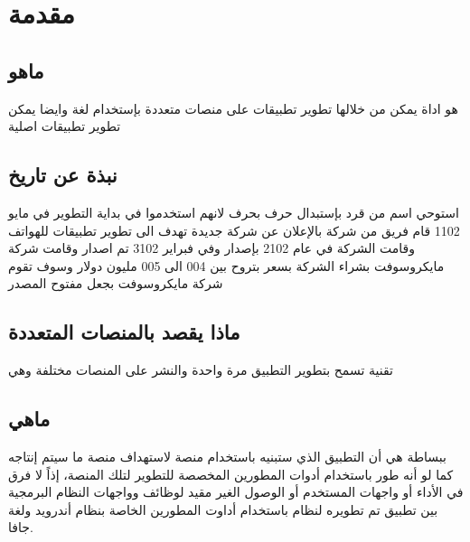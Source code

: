 \chapter{مقدمة}

\section {ماهو  }
هو اداة يمكن من خلالها تطوير تطبيقات على منصات متعددة  بإستخدام لغة  وايضا يمكن تطوير تطبيقات اصلية  
\section{نبذة عن تاريخ }
استوحي اسم  من قرد  بإستبدال حرف  بحرف   لانهم استخدموا في بداية التطوير 
في مايو 1102 قام فريق من شركة  بالإعلان عن شركة جديدة تهدف الى تطوير تطبيقات للهواتف وقامت الشركة في عام 2102 بإصدار  
وفي فبراير 3102 تم اصدار  
وقامت شركة مايكروسوفت بشراء الشركة بسعر بتروح بين 004 الى 005 مليون دولار 
وسوف تقوم شركة مايكروسوفت بجعل  مفتوح المصدر

\section{ماذا يقصد بالمنصات المتعددة }
تقنية تسمح بتطوير التطبيق مرة واحدة والنشر على المنصات مختلفة وهي 
\section{ماهي }
ببساطة هي أن التطبيق الذي ستبنيه باستخدام منصة  لاستهداف منصة ما سيتم إنتاجه كما لو أنه طور باستخدام أدوات المطورين المخصصة للتطوير لتلك المنصة، إذاً لا فرق في الأداء أو واجهات المستخدم أو الوصول الغير مقيد لوظائف وواجهات النظام البرمجية بين تطبيق تم تطويره لنظام  باستخدام أداوت المطورين الخاصة بنظام أندرويد ولغة جافا.

